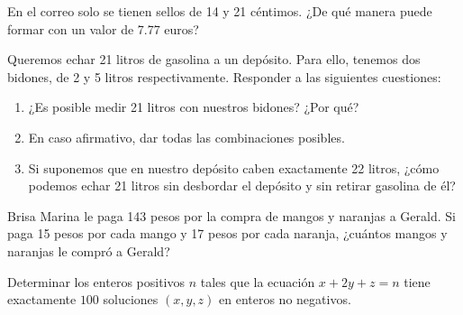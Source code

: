 \begin{problem}
    En el correo solo se tienen sellos de 14 y 21 céntimos.
    ¿De qué manera puede formar con un valor de 7.77 euros?
\end{problem}

\begin{problem}
    Queremos echar 21 litros de gasolina a un depósito.
    Para ello, tenemos dos bidones, de 2 y 5 litros respectivamente.
    Responder a las siguientes cuestiones:
    \begin{enumerate}
        \item ¿Es posible medir 21 litros con nuestros bidones? ¿Por qué?
        \item En caso afirmativo, dar todas las combinaciones posibles.
        \item Si suponemos que en nuestro depósito caben exactamente 22 litros, ¿cómo podemos echar 21 litros sin desbordar el depósito y sin retirar gasolina de él?
    \end{enumerate}
\end{problem}

\begin{problem}
    Brisa Marina le paga 143 pesos por la compra de mangos y naranjas a Gerald.
    Si paga 15 pesos por cada mango y 17 pesos por cada naranja, ¿cuántos mangos y naranjas le compró a Gerald?
\end{problem}

\begin{problem}
    Determinar los enteros positivos $n$ tales que la ecuación $x + 2y + z = n$ tiene exactamente $100$ soluciones
    $(x,y,z)$ en enteros no negativos.
\end{problem}